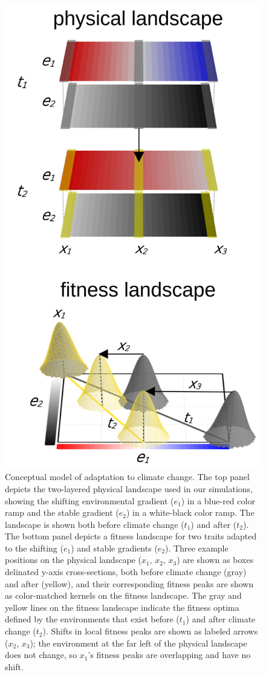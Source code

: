 \documentclass[9pt,twocolumn,twoside,lineno]{new_article}
\begin{document}
\begin{figure}%
\centering
\includegraphics[width=.8\linewidth]{pub/figs_and_stats/FIG_1_conceptual.jpg}
    \caption{Conceptual model of adaptation to climate change. The top panel depicts the two-layered physical landscape used in our simulations, showing the shifting environmental gradient ($e_{1}$) in a blue-red color ramp and the stable gradient ($e_{2}$) in a white-black color ramp. The landscape is shown both before climate change ($t_{1}$) and after ($t_{2}$). The bottom panel depicts a fitness landscape for two traits adapted to the shifting ($e_{1}$) and stable gradients ($e_{2}$). Three example positions on the physical landscape ($x_{1}$, $x_{2}$, $x_{3}$) are shown as boxes delinated y-axis cross-sections, both before climate change (gray) and after (yellow), and their corresponding fitness peaks are shown as color-matched kernels on the fitness landscape. The gray and yellow lines on the fitness landscape indicate the fitness optima defined by the environments that exist before ($t_{1}$) and after climate change ($t_{2}$). Shifts in local fitness peaks are shown as labeled arrows ($x_{2}$, $x_{3}$); the environment at the far left of the physical landscape does not change, so $x_{1}$'s fitness peaks are overlapping and have no shift.}
\label{fig:fig_1}
\end{figure}
\end{document}
